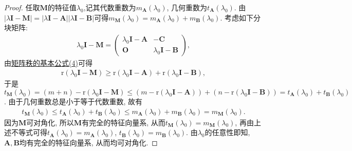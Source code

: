 \documentclass[../../main.tex]{subfiles}
\begin{document}
\begin{proof} 
任取\(\boldsymbol{M}\)的特征值\(\lambda_0\),记其代数重数为\(m_{\boldsymbol{A}}(\lambda_0)\), 几何重数为\(t_{\boldsymbol{A}}(\lambda_0)\).  由\(|\lambda\boldsymbol{I}-\boldsymbol{M}| = |\lambda\boldsymbol{I} - \boldsymbol{A}||\lambda\boldsymbol{I} - \boldsymbol{B}|\)可得\(m_{\boldsymbol{M}}(\lambda_0) = m_{\boldsymbol{A}}(\lambda_0)+m_{\boldsymbol{B}}(\lambda_0)\). 考虑如下分块矩阵:
\begin{align*}
\lambda_0\boldsymbol{I} - \boldsymbol{M} = \begin{pmatrix}
\lambda_0\boldsymbol{I} - \boldsymbol{A}&-\boldsymbol{C}\\
\boldsymbol{O}&\lambda_0\boldsymbol{I} - \boldsymbol{B}
\end{pmatrix},
\end{align*}
由\hyperref[矩阵秩的基本公式4]{矩阵秩的基本公式(4)}可得
\begin{align*}
\mathrm{r}(\lambda_0\boldsymbol{I} - \boldsymbol{M})\geqslant  \mathrm{r}(\lambda_0\boldsymbol{I} - \boldsymbol{A})+\mathrm{r}(\lambda_0\boldsymbol{I} - \boldsymbol{B}),
\end{align*}
于是\(t_{\boldsymbol{M}}(\lambda_0) = (m + n) - \mathrm{r}(\lambda_0\boldsymbol{I} - \boldsymbol{M})\leqslant  (m - \mathrm{r}(\lambda_0\boldsymbol{I} - \boldsymbol{A}))+(n - \mathrm{r}(\lambda_0\boldsymbol{I} - \boldsymbol{B})) = t_{\boldsymbol{A}}(\lambda_0)+t_{\boldsymbol{B}}(\lambda_0)\). 由于几何重数总是小于等于代数重数, 故有
\begin{align*}
t_{\boldsymbol{M}}(\lambda_0)\leqslant  t_{\boldsymbol{A}}(\lambda_0)+t_{\boldsymbol{B}}(\lambda_0)\leqslant  m_{\boldsymbol{A}}(\lambda_0)+m_{\boldsymbol{B}}(\lambda_0) = m_{\boldsymbol{M}}(\lambda_0).
\end{align*}
因为\(\boldsymbol{M}\)可对角化, 所以\(\boldsymbol{M}\)有完全的特征向量系, 从而\(t_{\boldsymbol{M}}(\lambda_0) = m_{\boldsymbol{M}}(\lambda_0)\), 再由上述不等式可得\(t_{\boldsymbol{A}}(\lambda_0) = m_{\boldsymbol{A}}(\lambda_0)\), \(t_{\boldsymbol{B}}(\lambda_0) = m_{\boldsymbol{B}}(\lambda_0)\). 由\(\lambda_0\)的任意性即知, \(\boldsymbol{A},\boldsymbol{B}\)均有完全的特征向量系, 从而均可对角化. 
\end{proof}
\end{document}
